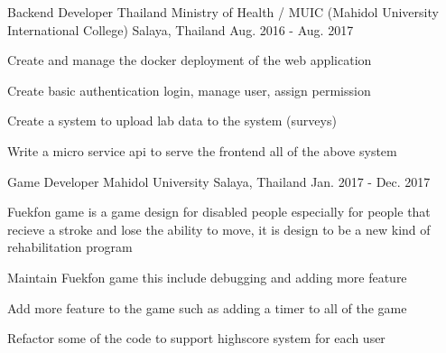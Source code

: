 

\begin{cventries}

  \cventry
    {Backend Developer} %
    {Thailand Ministry of Health / MUIC (Mahidol University International College)} %
    {Salaya, Thailand} %
    {Aug. 2016 - Aug. 2017} %
    {
      \begin{cvitems} %
        \item {Create and manage the docker deployment of the web application}
        \item {Create basic authentication login, manage user, assign permission}
        \item {Create a system to upload lab data to the system (surveys)}
        \item {Write a micro service api to serve the frontend all of the above system}
      \end{cvitems}
    }

  \cventry
    {Game Developer} %
    {Mahidol University} %
    {Salaya, Thailand} %
    {Jan. 2017 - Dec. 2017} %
    {
      \begin{cvitems} %
        \item {Fuekfon game is a game design for disabled people especially for people that recieve a stroke and lose the ability to move, it is design to be a new kind of rehabilitation program}
        \item {Maintain Fuekfon game this include debugging and adding more feature}
        \item {Add more feature to the game such as adding a timer to all of the game}
        \item {Refactor some of the code to support highscore system for each user}
      \end{cvitems}
    }


\end{cventries}

